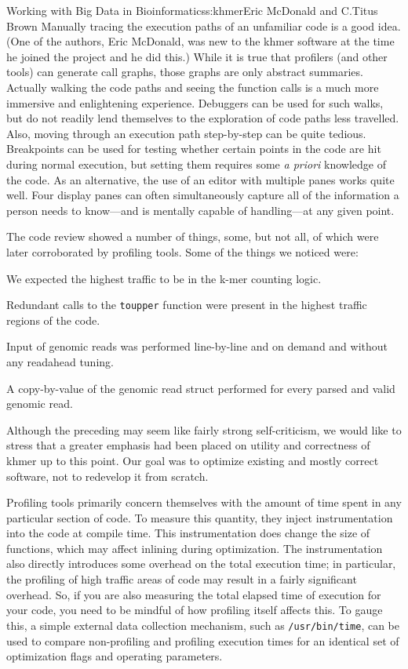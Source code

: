 \begin{aosachapter}{Working with Big Data in Bioinformatics}{s:khmer}{Eric McDonald and C.\/Titus Brown}
Manually tracing the execution paths of an unfamiliar code is a good
idea. (One of the authors, Eric McDonald, was new to the khmer software
at the time he joined the project and he did this.) While it is true
that profilers (and other tools) can generate call graphs, those graphs
are only abstract summaries. Actually walking the code paths and seeing
the function calls is a much more immersive and enlightening experience.
Debuggers can be used for such walks, but do not readily lend themselves
to the exploration of code paths less travelled. Also, moving through an
execution path step-by-step can be quite tedious. Breakpoints can be
used for testing whether certain points in the code are hit during
normal execution, but setting them requires some \emph{a priori}
knowledge of the code. As an alternative, the use of an editor with
multiple panes works quite well. Four display panes can often
simultaneously capture all of the information a person needs to
know---and is mentally capable of handling---at any given point.

The code review showed a number of things, some, but not all, of which
were later corroborated by profiling tools. Some of the things we
noticed were:

\begin{aosaitemize}
\item
  We expected the highest traffic to be in the k-mer counting logic.
\item
  Redundant calls to the \texttt{toupper} function were present in the
  highest traffic regions of the code.
\item
  Input of genomic reads was performed line-by-line and on demand and
  without any readahead tuning.
\item
  A copy-by-value of the genomic read struct performed for every parsed
  and valid genomic read.
\end{aosaitemize}

Although the preceding may seem like fairly strong self-criticism, we
would like to stress that a greater emphasis had been placed on utility
and correctness of khmer up to this point. Our goal was to optimize
existing and mostly correct software, not to redevelop it from scratch.


Profiling tools primarily concern themselves with the amount of time
spent in any particular section of code. To measure this quantity, they
inject instrumentation into the code at compile time. This
instrumentation does change the size of functions, which may affect
inlining during optimization. The instrumentation also directly
introduces some overhead on the total execution time; in particular, the
profiling of high traffic areas of code may result in a fairly
significant overhead. So, if you are also measuring the total elapsed
time of execution for your code, you need to be mindful of how profiling
itself affects this. To gauge this, a simple external data collection
mechanism, such as \texttt{/usr/bin/time}, can be used to compare
non-profiling and profiling execution times for an identical set of
optimization flags and operating parameters.


\end{aosachapter}

